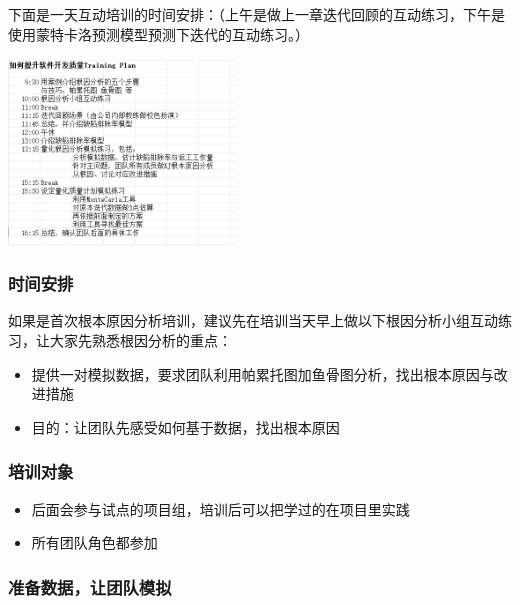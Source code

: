 下面是一天互动培训的时间安排：（上午是做上一章迭代回顾的互动练习，下午是使用蒙特卡洛预测模型预测下迭代的互动练习。）


\includegraphics[width=6cm]{微信截图_20230830093612.png}

\hypertarget{ux65f6ux95f4ux5b89ux6392}{%
\subsubsection{时间安排}\label{ux65f6ux95f4ux5b89ux6392}}

如果是首次根本原因分析培训，建议先在培训当天早上做以下根因分析小组互动练习，让大家先熟悉根因分析的重点：

\begin{itemize}
\tightlist
\item
  提供一对模拟数据，要求团队利用帕累托图加鱼骨图分析，找出根本原因与改进措施
\item
  目的：让团队先感受如何基于数据，找出根本原因
\end{itemize}

\hypertarget{ux57f9ux8badux5bf9ux8c61}{%
\subsubsection{培训对象}\label{ux57f9ux8badux5bf9ux8c61}}

\begin{itemize}
\tightlist
\item
  后面会参与试点的项目组，培训后可以把学过的在项目里实践
\item
  所有团队角色都参加
\end{itemize}

\hypertarget{ux51c6ux5907ux6570ux636eux8ba9ux56e2ux961fux6a21ux62df}{%
\subsubsection{准备数据，让团队模拟}\label{ux51c6ux5907ux6570ux636eux8ba9ux56e2ux961fux6a21ux62df}}

